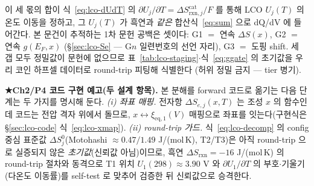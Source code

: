 \documentclass[11pt,a4paper]{article}
\newcommand{\eq}{\mathrm{eq}}
\newcommand{\rxn}{\mathrm{rxn}}
\begin{document}
이 세 몫의 합이 식~\eqref{eq:lco-dUdT} 의 $\partial U_j/\partial T=\Delta S_{\rxn,j}^\mathrm{cat}/F$ 를 통해 LCO
$U_j(T)$ 의 온도 이동을 정하고, 그 $U_j(T)$ 가 흑연과 \emph{같은} 합산식~\eqref{eq:sum} 으로 dQ/dV 에 들어간다.
본 문건이 추적하는 1차 문헌 공백은 셋이다: G1 $=$ 연속 $\Delta S(x)$, G2 $=$ 연속 $g(E_F,x)$
(\S\ref{sec:lco-Se} — G$n$ 일련번호의 선언 자리), G3 $=$ 도핑 shift. 세 갭 모두 정밀값이 문헌에 없으므로
표~\ref{tab:lco-staging}$\cdot$식~\eqref{eq:ggate} 의 초기값을 우리 코인 하프셀 데이터로 round-trip 피팅해 식별한다
(허위 정밀 금지 — tier 병기).

\textbf{★Ch2/P4 코드 구현 예고(두 설계 항목).} 본 분해를 forward 코드로 옮기는 다음 단계는 두 가지를 명시해 둔다.
\emph{(i) 좌표 매핑.} 전자항 $\Delta S_{e,j}(x,T)$ 는 조성 $x$ 의 함수인데 코드는 전압 격자 위에서 돌므로,
$x\!\leftrightarrow\!\xi_{\eq,1}(V)$ 매핑으로 좌표를 잇는다(구현식은 \S\ref{sec:lco-code} 식~\eqref{eq:lco-xmap}). \emph{(ii) round-trip 가드.} 식~\eqref{eq:lco-decomp} 의 config 중심 표준값
$\Delta S_j^0$(Motohashi\cite{motohashi2009} $\approx0.47/1.49$ J/(mol\,K), T2/T3)은 아직 round-trip 으로 실증되지 않은
\emph{초기값}(신뢰값 아님)이므로, 흑연 $\Delta S_\rxn{=}-16$ J/(mol\,K) 의 round-trip 절차와 동격으로 T1 위치
$U_1(298)\approx3.90$ V 와 $\partial U_1/\partial T$ 의 부호$\cdot$기울기(다온도 이동률)를 self-test 로 맞추어
검증한 뒤 신뢰값으로 승격한다.
\end{document}
